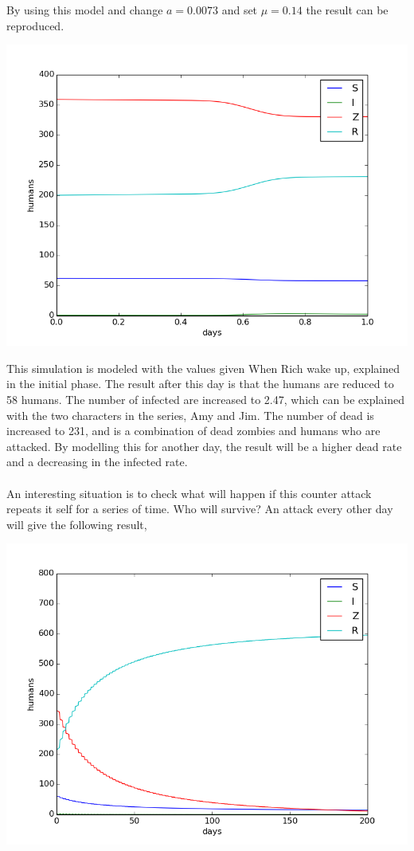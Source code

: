 \documentclass[%
twoside,                 %
final,                   %
10pt]{article}
\begin{document}
By using this model and change $a=0.0073$ and set $\mu=0.14$ the result can be reproduced.


\begin{center}  %
  \centerline{\includegraphics[width=0.9\linewidth]{plots/WD_zombie_counter_2.png}}
\end{center}


This simulation is modeled with the values given When Rich wake up, explained in the initial phase. The result after this day is that the humans are reduced to 58 humans. The number of infected are increased to 2.47, which can be explained with the two characters in the series, Amy and Jim. The number of dead is increased to 231, and is a combination of dead zombies and humans who are attacked. By modelling this for another day, the result will be a higher dead rate and a decreasing in the infected rate.
\\
\\
An interesting situation is to check what will happen if this counter attack repeats it self for a series of time. Who will survive? An attack every other day will give the following result,


\begin{center}  %
  \centerline{\includegraphics[width=0.9\linewidth]{plots/WD_zombie_counter_series.png}}
\end{center}
\end{document}

